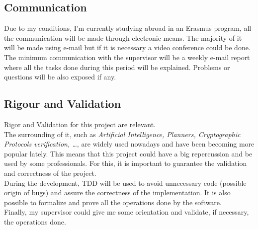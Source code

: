 \subsection{Communication}
Due to my conditions, I'm currently studying abroad in an Erasmus program, all the communication will be made through electronic means. The majority of it will be made using e-mail but if it is necessary a video conference could be done. \\
The minimum communication with the supervisor will be a weekly e-mail report where all the tasks done during this period will be explained. Problems or questions will be also exposed if any.

\subsection{Rigour and Validation}
Rigor and Validation for this project are relevant. \\
The surrounding of it, such as \emph{Artificial Intelligence, Planners, Cryptographic Protocols verification, \ldots}, are widely used nowadays and have been becoming more popular lately. This means that this project could have a big repercussion and be used by some professionals. For this, it is important to guarantee the validation and correctness of the project. \\
During the development, TDD will be used to avoid unnecessary code (possible origin of bugs) and assure the correctness of the implementation. It is also possible to formalize and prove all the operations done by the software.\\
Finally, my supervisor could give me some orientation and validate, if necessary, the operations done.